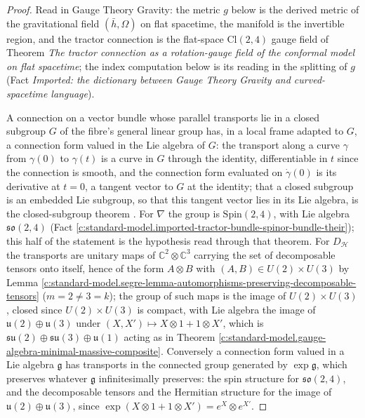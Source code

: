 \documentclass[11pt]{article}
\theoremstyle{definition}
\theoremstyle{plain}
\providecommand{\C}{}\renewcommand{\C}{\mathbb{C}}
\providecommand{\Cl}{}\renewcommand{\Cl}{\mathrm{Cl}}
\providecommand{\hb}{}\renewcommand{\hb}{\bar{h}}
\providecommand{\su}{}\renewcommand{\su}{\mathfrak{su}}
\providecommand{\uu}{}\renewcommand{\uu}{\mathfrak{u}}
\begin{document}
\begin{proof}
Read in Gauge Theory Gravity: the metric $g$ below is the derived metric of the gravitational field $(\hb, \Omega)$ on flat spacetime, the manifold is the invertible region, and the tractor connection is the flat-space $\Cl(2,4)$ gauge field of Theorem \emph{The tractor connection as a rotation-gauge field of the conformal model on flat spacetime}; the index computation below is its reading in the splitting of $g$ (Fact \emph{Imported: the dictionary between Gauge Theory Gravity and curved-spacetime language}).

A connection on a vector bundle whose parallel transports lie in a closed subgroup $G$ of the fibre's general linear group has, in a local frame adapted to $G$, a connection form valued in the Lie algebra of $G$: the transport along a curve $\gamma$ from $\gamma(0)$ to $\gamma(t)$ is a curve in $G$ through the identity, differentiable in $t$ since the connection is smooth, and the connection form evaluated on $\dot\gamma(0)$ is its derivative at $t = 0$, a tangent vector to $G$ at the identity; that a closed subgroup is an embedded Lie subgroup, so that this tangent vector lies in its Lie algebra, is the closed-subgroup theorem \cite[Thm.~20.12]{Lee2013}. For $\nabla$ the group is $\mathrm{Spin}(2,4)$, with Lie algebra $\mathfrak{so}(2,4)$ (Fact \ref{c:standard-model.imported-tractor-bundle-spinor-bundle-their}); this half of the statement is the hypothesis read through that theorem. For $D_{\mathcal{H}}$ the transports are unitary maps of $\C^{2} \otimes \C^{3}$ carrying the set of decomposable tensors onto itself, hence of the form $A \otimes B$ with $(A, B) \in U(2) \times U(3)$ by Lemma \ref{c:standard-model.segre-lemma-automorphisms-preserving-decomposable-tensors} ($m = 2 \neq 3 = k$); the group of such maps is the image of $U(2) \times U(3)$, closed since $U(2) \times U(3)$ is compact, with Lie algebra the image of $\uu(2) \oplus \uu(3)$ under $(X, X') \mapsto X \otimes 1 + 1 \otimes X'$, which is $\su(2) \oplus \su(3) \oplus \uu(1)$ acting as in Theorem \ref{c:standard-model.gauge-algebra-minimal-massive-composite}. Conversely a connection form valued in a Lie algebra $\mathfrak{g}$ has transports in the connected group generated by $\exp\mathfrak{g}$, which preserves whatever $\mathfrak{g}$ infinitesimally preserves: the spin structure for $\mathfrak{so}(2,4)$, and the decomposable tensors and the Hermitian structure for the image of $\uu(2) \oplus \uu(3)$, since $\exp(X \otimes 1 + 1 \otimes X') = e^{X} \otimes e^{X'}$.

\end{proof}
\end{document}
